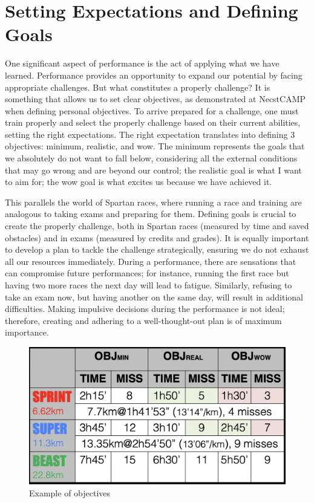 \documentclass[12pt,oneside,a4paper]{article}
\begin{document}
\section{Setting Expectations and Defining Goals} \label{sec:sett}
One significant aspect of performance is the act of applying what we have learned. Performance provides an opportunity to expand our potential by facing appropriate challenges. But what constitutes a properly challenge? It is something that allows us to set clear objectives, as demonstrated at NecstCAMP when defining personal objectives. To arrive prepared for a challenge, one must train properly and select the properly challenge based on their current abilities, setting the right expectations. The right expectation translates into defining 3 objectives: minimum, realistic, and wow. The minimum represents the goals that we absolutely do not want to fall below, considering all the external conditions that may go wrong and are beyond our control; the realistic goal is what I want to aim for; the wow goal is what excites us because we have achieved it. 

This parallels the world of Spartan races, where running a race and training are analogous to taking exams and preparing for them. Defining goals is crucial to create the properly challenge, both in Spartan races (measured by time and saved obstacles) and in exams (measured by credits and grades). It is equally important to develop a plan to tackle the challenge strategically, ensuring we do not exhaust all our resources immediately. During a performance, there are sensations that can compromise future performances; for instance, running the first race but having two more races the next day will lead to fatigue. Similarly, refusing to take an exam now, but having another on the same day, will result in additional difficulties. Making impulsive decisions during the performance is not ideal; therefore, creating and adhering to a well-thought-out plan is of maximum importance.
\begin{figure}[h]
    \centering
    \includegraphics[width=.7\textwidth]{tabella.png}
    \caption{Example of objectives}
    \label{fig:my_label}
\end{figure}
\end{document}
